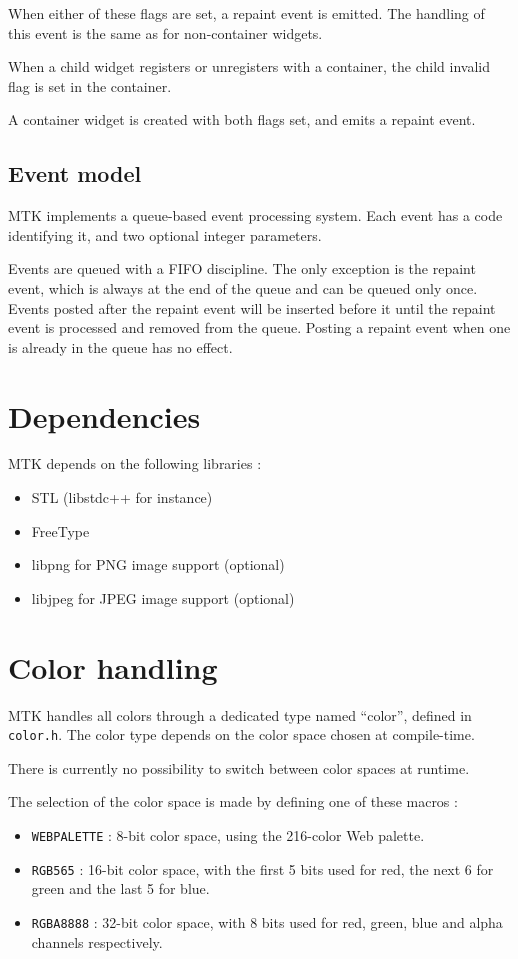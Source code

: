 \documentclass[a4paper,11pt]{journal}
\begin{document}
When either of these flags are set, a repaint event is emitted. The handling of this event is the same as for non-container widgets.

When a child widget registers or unregisters with a container, the child invalid flag is set in the container.

A container widget is created with both flags set, and emits a repaint event.

\subsection{Event model}
MTK implements a queue-based event processing system. Each event has a code identifying it, and two optional integer parameters.

Events are queued with a FIFO discipline. The only exception is the repaint event, which is always at the end of the queue and can be queued only once. Events posted after the repaint event will be inserted before it until the repaint event is processed and removed from the queue. Posting a repaint event when one is already in the queue has no effect.

\section{Dependencies}
MTK depends on the following libraries :
\begin{itemize}[noitemsep,topsep=0mm]
\item STL (libstdc++ for instance)
\item FreeType
\item libpng for PNG image support (optional)
\item libjpeg for JPEG image support (optional)
\end{itemize}

\section{Color handling}
MTK handles all colors through a dedicated type named ``color'', defined in \verb!color.h!. The color type depends on the color space chosen at compile-time.

There is currently no possibility to switch between color spaces at runtime.

The selection of the color space is made by defining one of these macros :
\begin{itemize}[noitemsep,topsep=0mm]
\item \verb!WEBPALETTE! : 8-bit color space, using the 216-color Web palette.
\item \verb!RGB565! : 16-bit color space, with the first 5 bits used for red, the next 6 for green and the last 5 for blue.
\item \verb!RGBA8888! : 32-bit color space, with 8 bits used for red, green, blue and alpha channels respectively.
\end{itemize}
\end{document}
